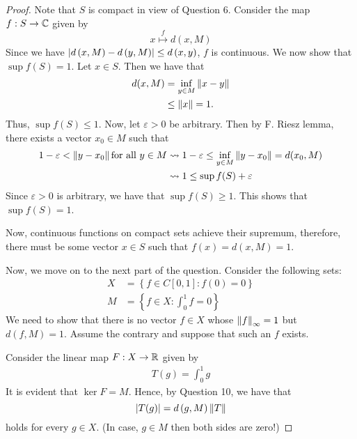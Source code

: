 \begin{proof}
    Note that $S$ is compact in view of Question 6.
    Consider the map $f: S \to \mathbb C$ given by 
    \begin{equation*}
	x \stackrel{f}{\mapsto} d\left( x, M \right)
    \end{equation*}
    Since we have $\left\lvert d\left( x,M \right) -d\left( y,M \right) \right\rvert \le d\left( x,y \right)$, $f$ is continuous. We now show that $\sup f\left( S \right) = 1$.
    Let $x\in S$. Then we have that
    \begin{align*}
	d(x,M) &= \inf_{y \in M} \left\lVert x-y \right\rVert \\
	&\le \left\lVert x \right\rVert=1\text{.} \\
    \end{align*}
    Thus, $\sup f\left( S \right) \le 1$. Now, let $\varepsilon >0$ be arbitrary. Then by F. Riesz lemma, there exists a vector $x_{0} \in M$ such that 
    \begin{align*}
	1-\varepsilon < \left\lVert y-x_{0} \right\rVert \text{for all } y \in M &\leadsto 1-\varepsilon \le \inf_{y\in M} \left\lVert y-x_{0} \right\rVert=d(x_{0},M) \\
	& \leadsto 1\le \sup f(S) + \varepsilon
    \end{align*}
    Since $\varepsilon > 0$ is arbitrary, we have that $\sup f\left( S \right) \ge 1$. This shows that $\sup f\left( S \right) =1$.

    Now, continuous functions on compact sets achieve their supremum, therefore, there must be some vector $x \in S$ such that $f(x)=d(x,M) =1$.

    Now, we move on to the next part of the question. Consider the following sets:
    \begin{align*}
	X&= \left\{ f \in C[0,1] : f(0)=0 \right\} \\
	M&= \left\{ f\in X : \int_{0}^{1} f = 0 \right\}
    \end{align*}
    We need to show that there is no vector $f\in X$ whose $\left\lVert f \right\rVert_{\infty}=1$ but $d(f,M)=1$. Assume the contrary and suppose that such an $f$ exists.

    Consider the linear map $F : X \to \mathbb R$ given by
    \begin{align*}
	T(g)=\int_{0}^{1} g
    \end{align*}
    It is evident that $\ker F =M$. Hence, by Question 10, we have that
    \begin{equation*}
	\left\lvert T(g) \right\rvert=d\left( g, M \right) \left\lVert T \right\rVert
    \end{equation*}
    holds for every $g\in X$. (In case, $g\in M$ then both sides are zero!)
    

\end{proof}
